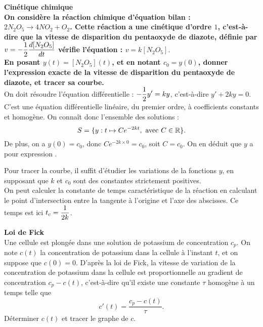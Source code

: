\documentclass[a4paper, 11pt,reqno]{article}
\begin{document}
\begin{correction}  \; \textbf{Cin\'etique chimique}\\
\textbf{On consid\`ere la r\'eaction chimique d'\'equation bilan : $2N_2O_5 \rightarrow 4 NO_2 + O_2$. Cette r\'eaction a une cin\'etique d'ordre $1$, c'est-\`a-dire que la vitesse de disparition du pentaoxyde de diazote, d\'efinie par $v = \displaystyle - \frac{1}{2} \frac{d [N_2O_5]}{dt}$ v\'erifie l'\'equation : $v = k [N_2O_5].$\\
En posant $y(t) = [N_2O_5](t)$, et en notant $c_0=y(0)$, donner l'expression exacte de la vitesse de disparition du pentaoxyde de diazote, et tracer sa courbe.}\\ %
On doit r\'esoudre l'\'equation diff\'erentielle : $-\displaystyle \frac{1}{2} y' =  ky$, c'est-\`a-dire $y'+2 k y = 0$. C'est une \'equation diff\'erentielle lin\'eaire, du premier ordre, \`a coefficients constants et homog\`ene. On conna\^it donc l'ensemble des solutions : 
$$S= \{ y : t \mapsto C e^{-2kt}, \textmd{ avec }C \in \mathbb{R}\}.$$
De plus, on a $y(0) = c_0$, donc $C e^{-2k\times 0} = c_0$, soit $C=c_0$. On en d\'eduit que $y$ a pour expression .
\begin{center}

\hspace*{0.5cm} \begin{minipage}[c]{0.95\linewidth}
Pour tracer la courbe, il suffit d'\'etudier les variations de la fonctions $y$, en supposant que $k$ et $c_0$ sont des constantes strictement positives.\\
On peut calculer la constante de temps caract\'eristique de la r\'eaction en calculant le point d'intersection entre la tangente \`a l'origine et l'axe des abscisses. Ce temps est ici $\displaystyle t_c = \frac{1}{2k}$.
\end{minipage}
\end{center}

\end{correction}








\begin{exercice}  \; \textbf{Loi de Fick}\\
Une cellule est plong\'ee dans une solution de potassium de concentration $c_p$. On note $c(t)$ la concentration de potassium dans la cellule \`a l'instant $t$, et on suppose que $c(0)=0$. D'apr\`es la loi de Fick, la vitesse de variation de la concentration de potassium dans la cellule est proportionnelle au gradient de concentration $c_p-c(t)$, c'est-\`a-dire qu'il existe une constante $\tau$ homog\`ene \`a un temps telle que 
$$c'(t) = \frac{c_p-c(t)}{\tau}.$$
D\'eterminer $c(t)$ et tracer le graphe de $c$.
\end{exercice}
\end{document}
